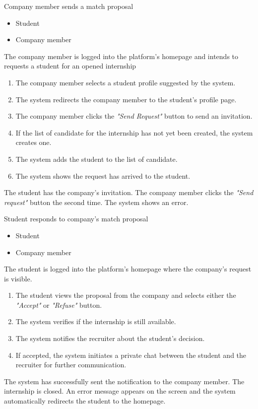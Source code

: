 \usecase
{Company member sends a match proposal}
{
    \begin{itemize}
        \item Student   
        \item Company member
    \end{itemize}
}
{
    The company member is logged into the platform's homepage and intends to requests a student for an opened internship
}
{
    \begin{enumerate}
        \item The company member selects a student profile suggested by the system.
        \item The system redirects the company member to the student's profile page.
        \item The company member clicks the \textit{"Send Request"} button to send an invitation.
        \item If the list of candidate for the internship has not yet been created, the system creates one. 
        \item The system adds the student to the list of candidate.
        \item The system shows the request has arrived to the student. 
    \end{enumerate}
}
{
    The student has the company's invitation.
}
{
    The company member clicks the \textit{"Send request"} button the second time. The system shows an error.
}
{}


\usecase 
{Student responds to company's match proposal}
{
    \begin{itemize}
        \item Student
        \item Company member
    \end{itemize}
} 
{The student is logged into the platform's homepage where the company's request is visible.}
{
    \begin{enumerate}
        \item The student views the proposal from the company and selects either the \textit{"Accept"} or \textit{"Refuse"} button.
        \item The system verifies if the internship is still available.
        \item The system notifies the recruiter about the student's decision.
        \item If accepted, the system initiates a private chat between the student and the recruiter for further communication.
    \end{enumerate}
}
{
The system has successfully sent the notification to the company member.
}
{
The internship is closed. An error message appears on the screen and the system automatically redirects the student to the homepage.
}
{}

